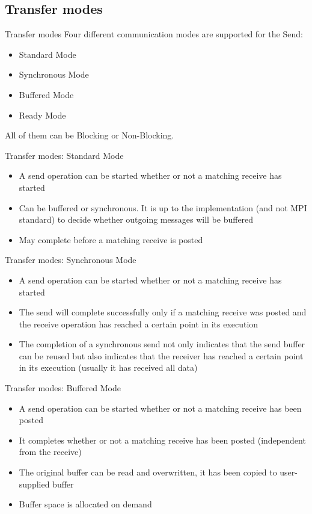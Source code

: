 \documentclass[aspectratio=43]{beamer}
\begin{document}
\subsection{Transfer modes}
\begin{frame}{Transfer modes}
Four different communication modes are supported for the Send:
\begin{itemize}
    \item Standard Mode
    \item Synchronous Mode
    \item Buffered Mode
    \item Ready Mode
\end{itemize}
All of them can be Blocking or Non-Blocking.
\end{frame}


\begin{frame}{Transfer modes: Standard Mode}
\begin{itemize}
\item A send operation can be started whether or not a matching receive has started
\item Can be buffered or synchronous. It is up to the implementation (and not MPI standard) to decide whether outgoing messages will be buffered
\item May complete before a matching receive is posted
\end{itemize}
\end{frame}

\begin{frame}{Transfer modes: Synchronous Mode}
\begin{itemize}
\item A send operation can be started whether or not a matching receive has started
\item The send will complete successfully only if a matching receive was posted and the receive operation has reached a certain point in its execution
\item The completion of a synchronous send not only indicates that the send buffer can be reused but also indicates that the receiver has reached a certain point in its execution (usually it has received all data)
\end{itemize}
\end{frame}

\begin{frame}[fragile]{Transfer modes: Buffered Mode}
\begin{itemize}
\item A send operation can be started whether or not a matching receive has been posted
\item It completes whether or not a matching receive has been posted (independent from the receive)
\item The original buffer can be read and overwritten, it has been copied to user-supplied buffer
\item Buffer space is allocated on demand 
\end{itemize}
\end{frame}
\end{document}
